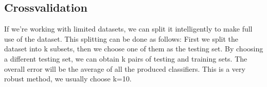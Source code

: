\subsection{Crossvalidation}
If we're working with limited datasets, we can split it intelligently to make full use of the dataset.
This splitting can be done as follows: First we split the dataset into k subsets, then we choose one of them as the testing set.
By choosing a different testing set, we can obtain k pairs of testing and training sets. The overall error will be the average of all
the produced classifiers. This is a very robust method, we usually choose k=10.


